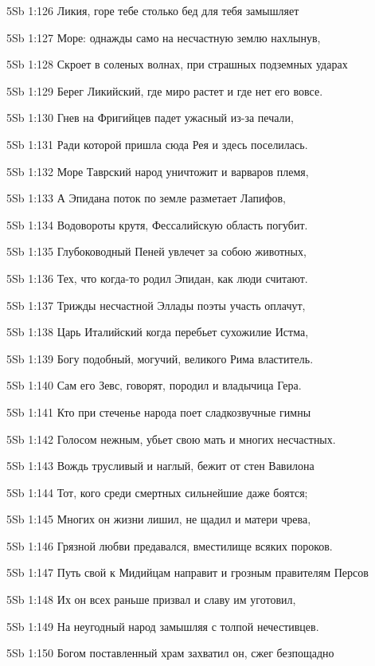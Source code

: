 \vs 5Sb 1:126 Ликия, горе тебе  столько бед для тебя замышляет 

\vs 5Sb 1:127 Море: однажды само на несчастную землю нахлынув, 

\vs 5Sb 1:128 Скроет в соленых волнах, при страшных подземных ударах 

\vs 5Sb 1:129 Берег Ликийский, где миро растет и где нет его вовсе.

\vs 5Sb 1:130 Гнев на Фригийцев падет ужасный из-за печали, 

\vs 5Sb 1:131 Ради которой пришла сюда Рея и здесь поселилась. 

\vs 5Sb 1:132 Море Таврский народ уничтожит и варваров племя, 

\vs 5Sb 1:133 А Эпидана поток по земле разметает Лапифов, 

\vs 5Sb 1:134 Водовороты крутя, Фессалийскую область погубит.

\vs 5Sb 1:135 Глубоководный Пеней увлечет за собою животных, 

\vs 5Sb 1:136 Тех, что когда-то родил Эпидан, как люди считают.

\vs 5Sb 1:137 Трижды несчастной Эллады поэты участь оплачут, 

\vs 5Sb 1:138 Царь Италийский когда перебьет сухожилие Истма, 

\vs 5Sb 1:139 Богу подобный, могучий, великого Рима властитель.

\vs 5Sb 1:140 Сам его Зевс, говорят, породил и владычица Гера. 

\vs 5Sb 1:141 Кто при стеченье народа поет сладкозвучные гимны

\vs 5Sb 1:142 Голосом нежным, убьет свою мать и многих несчастных.

\vs 5Sb 1:143 Вождь трусливый и наглый, бежит от стен Вавилона 

\vs 5Sb 1:144 Тот, кого среди смертных сильнейшие даже боятся; 

\vs 5Sb 1:145 Многих он жизни лишил, не щадил и матери чрева,

\vs 5Sb 1:146 Грязной любви предавался, вместилище всяких пороков.

\vs 5Sb 1:147 Путь свой к Мидийцам направит и грозным правителям Персов 

\vs 5Sb 1:148 Их он всех раньше призвал и славу им уготовил,

\vs 5Sb 1:149 На неугодный народ замышляя с толпой нечестивцев. 

\vs 5Sb 1:150 Богом поставленный храм захватил он, сжег безпощадно

